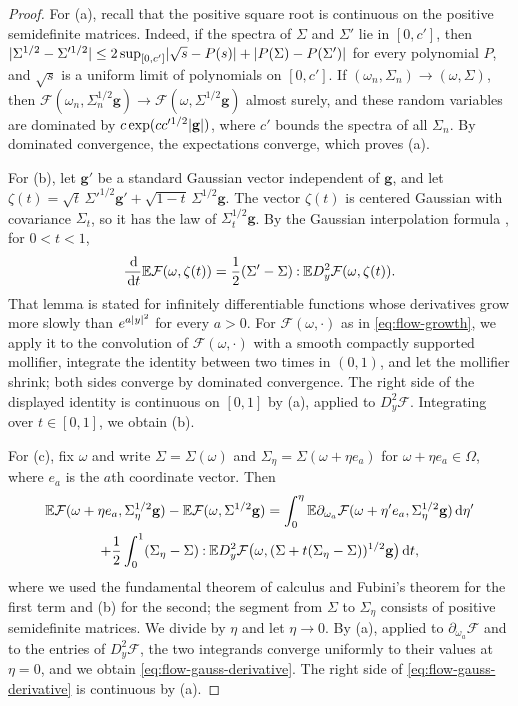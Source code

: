 \begin{proof}
For (a), recall that the positive square root is continuous on the positive
semidefinite matrices. Indeed, if the spectra of $\Sigma$ and $\Sigma'$ lie in
$[0,c']$, then $\lvert \Sigma^{1/2}-\Sigma'^{1/2}\rvert\le2\sup_{[0,c']}\lvert \sqrt s-P(s)\rvert
+\lvert P(\Sigma)-P(\Sigma')\rvert$ for every polynomial $P$, and $\sqrt s$ is a uniform
limit of polynomials on $[0,c']$. If $(\omega_n,\Sigma_n)\to(\omega,\Sigma)$, then
$\mathcal F(\omega_n,\Sigma_n^{1/2}\mathbf g)\to\mathcal F(\omega,\Sigma^{1/2}\mathbf g)$ almost surely, and
these random variables are dominated by $c\exp(cc'^{1/2}\lvert \mathbf g\rvert)$, where $c'$ bounds
the spectra of all $\Sigma_n$. By dominated convergence, the expectations
converge, which proves (a).

For (b), let $\mathbf g'$ be a standard Gaussian vector independent of $\mathbf g$, and let
$\zeta(t)=\sqrt t\,\Sigma'^{1/2}\mathbf g'+\sqrt{1-t}\,\Sigma^{1/2}\mathbf g$. The vector $\zeta(t)$ is
centered Gaussian with covariance $\Sigma_t$, so it has the law of
$\Sigma_t^{1/2}\mathbf g$. By the Gaussian interpolation formula
\cite[Lemma~1.3.1]{talagrand-2011}, for $0<t<1$,
\[
 \frac{\,\mathrm d}{\,\mathrm d t}\mathbb E\mathcal F(\omega,\zeta(t))
 =\frac12(\Sigma'-\Sigma)\mathbin{:}\mathbb E D_y^2\mathcal F(\omega,\zeta(t)).
\]
That lemma is stated for infinitely differentiable functions whose derivatives
grow more slowly than $e^{a\lvert y\rvert^2}$ for every $a>0$. For $\mathcal F(\omega,\cdot)$
as in \eqref{eq:flow-growth}, we apply it to the convolution of $\mathcal F(\omega,\cdot)$
with a smooth compactly supported mollifier, integrate the identity between two
times in $(0,1)$, and let the mollifier shrink; both sides converge by dominated
convergence. The right side of the displayed identity is continuous on $[0,1]$ by
(a), applied to $D^2_y\mathcal F$. Integrating over $t\in[0,1]$, we obtain (b).

For (c), fix $\omega$ and write $\Sigma=\Sigma(\omega)$ and
$\Sigma_\eta=\Sigma(\omega+\eta e_a)$ for $\omega+\eta e_a\in\Omega$, where
$e_a$ is the $a$th coordinate vector. Then
\begin{multline*}
 \mathbb E\mathcal F(\omega+\eta e_a,\Sigma_\eta^{1/2}\mathbf g)-\mathbb E\mathcal F(\omega,\Sigma^{1/2}\mathbf g)
 =\int_0^\eta\mathbb E\partial_{\omega_a}\mathcal F(\omega+\eta'e_a,\Sigma_\eta^{1/2}\mathbf g)\,\mathrm d\eta'\\
 +\frac12\int_0^1(\Sigma_\eta-\Sigma)\mathbin{:}
 \mathbb E D_y^2\mathcal F\bigl(\omega,(\Sigma+t(\Sigma_\eta-\Sigma))^{1/2}\mathbf g\bigr)\,\mathrm d t,
\end{multline*}
where we used the fundamental theorem of calculus and Fubini's theorem for the
first term and (b) for the second; the segment from $\Sigma$ to $\Sigma_\eta$
consists of positive semidefinite matrices. We divide by $\eta$ and let
$\eta\to0$. By (a), applied to $\partial_{\omega_a}\mathcal F$ and to the entries of
$D^2_y\mathcal F$, the two integrands converge uniformly to their values at $\eta=0$,
and we obtain \eqref{eq:flow-gauss-derivative}. The right side of
\eqref{eq:flow-gauss-derivative} is continuous by (a).
\end{proof}

